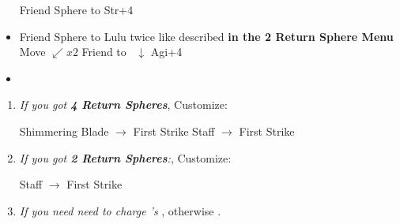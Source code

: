 \begin{spheregrid}
    \begin{itemize}
        \yunaf Friend Sphere to \tidus
        \yunaf Str+4
        \item Friend Sphere to Lulu twice like described \textbf{in the 2 Return Sphere Menu}
        \kimahrif Move $\swarrow x2$
        \yunaf Friend to \kimahri\ $\downarrow$
        \yunaf Agi+4
        \item {}
    \end{itemize}
\end{spheregrid}
\begin{enumerate}[resume]
    \item \textit{If you got \textbf{4 Return Spheres}}, Customize:
    \begin{itemize}
        \auronf Shimmering Blade $\rightarrow$ First Strike
        \yunaf Staff $\rightarrow$ First Strike
    \end{itemize}
    \item \textit{If you got \textbf{2 Return Spheres}:}, Customize:
    \begin{itemize}
        \yunaf Staff $\rightarrow$ First Strike
    \end{itemize}
    \item \textit{If you need need to charge \rikku's \od} \formation{\tidus}{\rikku}{\auron}, otherwise \formation{\tidus}{\kimahri}{\wakka}.
\end{enumerate}
